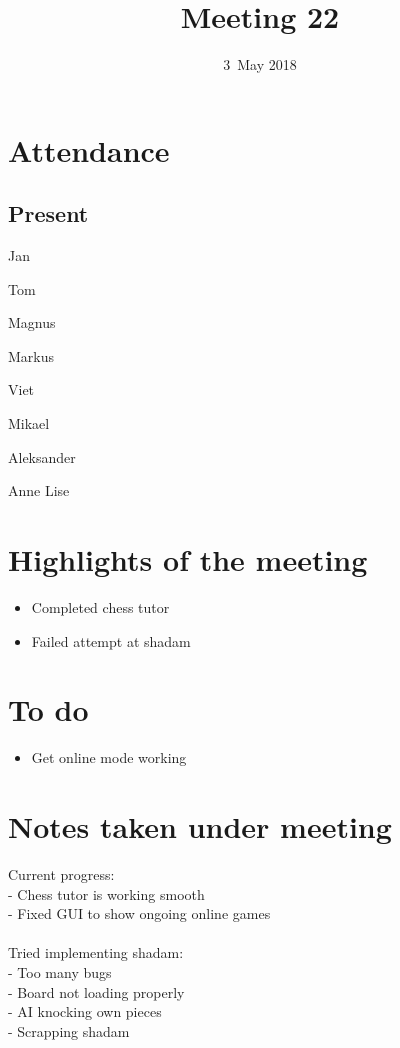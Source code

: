 \documentclass[letterpaper,11pt]{article}
\title{Meeting 22}
\date{3~May 2018}
\begin{document}
\maketitle
\section*{Attendance}
\subsection*{Present}
\begin{list}{}{}
	\item Jan
	\item Tom
	\item Magnus
	\item Markus
	\item Viet
	\item Mikael
	\item Aleksander
	\item Anne Lise
\end{list}

\newpage
\section*{Highlights of the meeting}
\begin{itemize}
	\item Completed chess tutor
	\item Failed attempt at shadam
\end{itemize}

\section*{To do}
\begin{itemize}
	\item Get online mode working
\end{itemize}

\section*{Notes taken under meeting}
Current progress:\\
- Chess tutor is working smooth\\
- Fixed GUI to show ongoing online games\\\\
Tried implementing shadam:\\
- Too many bugs\\
- Board not loading properly\\
- AI knocking own pieces\\
- Scrapping shadam
\end{document}
